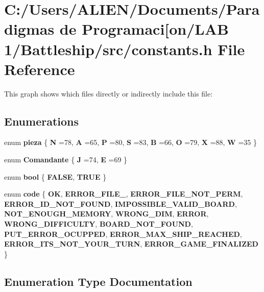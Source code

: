 \section{C\+:/\+Users/\+A\+L\+I\+E\+N/\+Documents/\+Paradigmas de Programaci[on/\+L\+AB 1/\+Battleship/src/constants.h File Reference}
\label{constants_8h}\index{C\+:/\+Users/\+A\+L\+I\+E\+N/\+Documents/\+Paradigmas de Programaci[on/\+L\+A\+B 1/\+Battleship/src/constants.\+h@{C\+:/\+Users/\+A\+L\+I\+E\+N/\+Documents/\+Paradigmas de Programaci[on/\+L\+A\+B 1/\+Battleship/src/constants.\+h}}
This graph shows which files directly or indirectly include this file\+:
\subsection*{Enumerations}
\begin{DoxyCompactItemize}
\item 
enum {\bf pieza} \{ \newline
{\bf N} =78, 
{\bf A} =65, 
{\bf P} =80, 
{\bf S} =83, 
\newline
{\bf B} =66, 
{\bf O} =79, 
{\bf X} =88, 
{\bf W} =35
 \}
\item 
enum {\bf Comandante} \{ {\bf J} =74, 
{\bf E} =69
 \}
\item 
enum {\bf bool} \{ {\bf F\+A\+L\+SE}, 
{\bf T\+R\+UE}
 \}
\item 
enum {\bf code} \{ \newline
{\bf OK}, 
{\bf E\+R\+R\+O\+R\+\_\+\+F\+I\+L\+E\+\_}, 
{\bf E\+R\+R\+O\+R\+\_\+\+F\+I\+L\+E\+\_\+\+N\+O\+T\+\_\+\+P\+E\+RM}, 
{\bf E\+R\+R\+O\+R\+\_\+\+I\+D\+\_\+\+N\+O\+T\+\_\+\+F\+O\+U\+ND}, 
\newline
{\bf I\+M\+P\+O\+S\+S\+I\+B\+L\+E\+\_\+\+V\+A\+L\+I\+D\+\_\+\+B\+O\+A\+RD}, 
{\bf N\+O\+T\+\_\+\+E\+N\+O\+U\+G\+H\+\_\+\+M\+E\+M\+O\+RY}, 
{\bf W\+R\+O\+N\+G\+\_\+\+D\+IM}, 
{\bf E\+R\+R\+OR}, 
\newline
{\bf W\+R\+O\+N\+G\+\_\+\+D\+I\+F\+F\+I\+C\+U\+L\+TY}, 
{\bf B\+O\+A\+R\+D\+\_\+\+N\+O\+T\+\_\+\+F\+O\+U\+ND}, 
{\bf P\+U\+T\+\_\+\+E\+R\+R\+O\+R\+\_\+\+O\+C\+U\+P\+P\+ED}, 
{\bf E\+R\+R\+O\+R\+\_\+\+M\+A\+X\+\_\+\+S\+H\+I\+P\+\_\+\+R\+E\+A\+C\+H\+ED}, 
\newline
{\bf E\+R\+R\+O\+R\+\_\+\+I\+T\+S\+\_\+\+N\+O\+T\+\_\+\+Y\+O\+U\+R\+\_\+\+T\+U\+RN}, 
{\bf E\+R\+R\+O\+R\+\_\+\+G\+A\+M\+E\+\_\+\+F\+I\+N\+A\+L\+I\+Z\+ED}
 \}
\end{DoxyCompactItemize}


\subsection{Enumeration Type Documentation}
\label{constants_8h_af6a258d8f3ee5206d682d799316314b1} 
